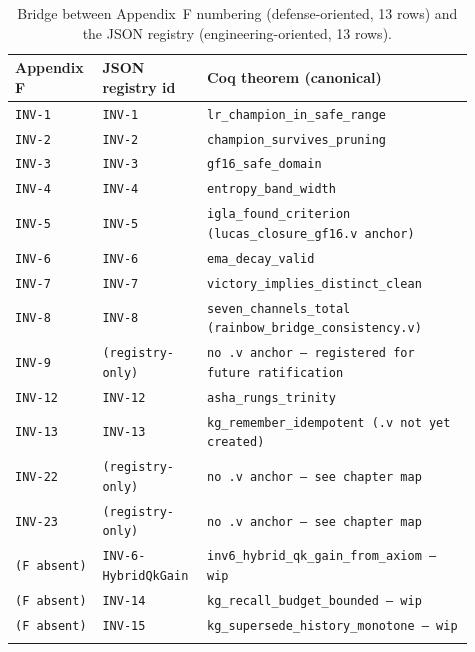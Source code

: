 \begin{small}
\begin{longtable}{@{}p{0.18\linewidth}p{0.18\linewidth}p{0.55\linewidth}@{}}
\toprule
\textbf{Appendix F} & \textbf{JSON registry id} & \textbf{Coq theorem (canonical)} \\
\midrule
\texttt{INV-1} & \texttt{INV-1} & \texttt{lr\_champion\_in\_safe\_range} \\
\texttt{INV-2} & \texttt{INV-2} & \texttt{champion\_survives\_pruning} \\
\texttt{INV-3} & \texttt{INV-3} & \texttt{gf16\_safe\_domain} \\
\texttt{INV-4} & \texttt{INV-4} & \texttt{entropy\_band\_width} \\
\texttt{INV-5} & \texttt{INV-5} & \texttt{igla\_found\_criterion (lucas\_closure\_gf16.v anchor)} \\
\texttt{INV-6} & \texttt{INV-6} & \texttt{ema\_decay\_valid} \\
\texttt{INV-7} & \texttt{INV-7} & \texttt{victory\_implies\_distinct\_clean} \\
\texttt{INV-8} & \texttt{INV-8} & \texttt{seven\_channels\_total (rainbow\_bridge\_consistency.v)} \\
\texttt{INV-9} & \texttt{(registry-only)} & \texttt{no .v anchor — registered for future ratification} \\
\texttt{INV-12} & \texttt{INV-12} & \texttt{asha\_rungs\_trinity} \\
\texttt{INV-13} & \texttt{INV-13} & \texttt{kg\_remember\_idempotent (.v not yet created)} \\
\texttt{INV-22} & \texttt{(registry-only)} & \texttt{no .v anchor — see chapter map} \\
\texttt{INV-23} & \texttt{(registry-only)} & \texttt{no .v anchor — see chapter map} \\
\texttt{(F absent)} & \texttt{INV-6-HybridQkGain} & \texttt{inv6\_hybrid\_qk\_gain\_from\_axiom — wip} \\
\texttt{(F absent)} & \texttt{INV-14} & \texttt{kg\_recall\_budget\_bounded — wip} \\
\texttt{(F absent)} & \texttt{INV-15} & \texttt{kg\_supersede\_history\_monotone — wip} \\
\bottomrule
\caption{Bridge between Appendix~F numbering (defense-oriented, 13 rows) and
  the JSON registry (engineering-oriented, 13 rows).}
\end{longtable}
\end{small}

